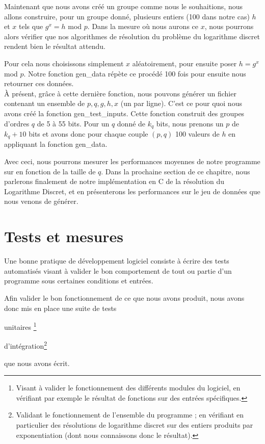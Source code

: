        Maintenant que nous avons créé un groupe comme nous le souhaitions, nous allons construire, pour un groupe donné, plusieurs entiers (100 dans notre cas) $h$ et $x$ tels que $g^x = h$ mod $p$. Dans la mesure où nous aurons ce $x$, nous pourrons alors vérifier que nos algorithmes de résolution du problème du logarithme discret rendent bien le résultat attendu.

        Pour cela nous choisissons simplement $x$ aléatoirement, pour ensuite poser $h = g^x$ mod $p$. Notre fonction gen\_data répète ce procédé 100 fois pour ensuite nous retourner ces données.\\

        À présent, grâce à cette dernière fonction, nous pouvons générer un fichier contenant un ensemble de $p, q, g, h, x$ (un par ligne). C'est ce pour quoi nous avons créé la fonction gen\_test\_inputs. Cette fonction construit des groupes d'ordres $q$ de 5 à 55 bits. Pour un $q$ donné de $k_q$ bits, nous prenons un $p$ de $k_q + 10$ bits et avons donc pour chaque couple $(p,q)$ 100 valeurs de $h$ en appliquant la fonction gen\_data.

        Avec ceci, nous pourrons mesurer les performances moyennes de notre programme sur en fonction de la taille de $q$. Dans la prochaine section de ce chapitre, nous parlerons finalement de notre implémentation en C de la résolution du Logarithme Discret, et en présenterons les performances sur le jeu de données que nous venons de générer.


    \section{Tests et mesures}
      Une bonne pratique de développement logiciel consiste à écrire des tests automatisés visant à valider le bon comportement de tout ou partie d'un programme sous certaines conditions et entrées.

      Afin valider le bon fonctionnement de ce que nous avons produit, nous avons donc mis en place une suite de tests
      \begin{enumerate*}
        \item unitaires \footnote{Visant à valider le fonctionnement des différents modules du logiciel, en vérifiant par exemple le résultat de fonctions sur des entrées spécifiques.}
        \item d'intégration\footnote{Validant le fonctionnement de l'ensemble du programme ; en vérifiant en particulier des résolutions de logarithme discret sur des entiers produits par exponentiation (dont nous connaissons donc le résultat).}
      \end{enumerate*}
      que nous avons écrit.


